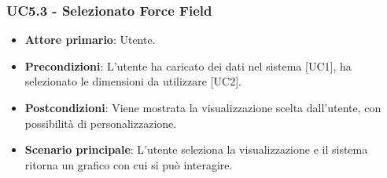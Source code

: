 \subsubsection{UC5.3 - Selezionato Force Field}
\begin{itemize}
	\item \textbf{Attore primario}: Utente.
	\item \textbf{Precondizioni}: L'utente ha caricato dei dati nel sistema [UC1], ha selezionato le dimensioni da utilizzare [UC2].
	\item \textbf{Postcondizioni}: Viene mostrata la visualizzazione  scelta dall'utente, con possibilità di personalizzazione.
	\item \textbf{Scenario principale}: L'utente seleziona la visualizzazione  e il sistema ritorna un grafico con cui si può interagire.
\end{itemize}